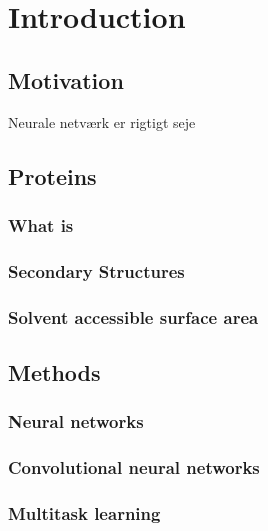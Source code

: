 \section{Introduction}
\subsection{Motivation}
Neurale netværk er rigtigt seje \cite{bishop2006}
\subsection{Proteins}
\subsubsection{What is}
\subsubsection{Secondary Structures}
\subsubsection{Solvent accessible surface area}
\subsection{Methods}
\subsubsection{Neural networks}
\subsubsection{Convolutional neural networks}
\subsubsection{Multitask learning}